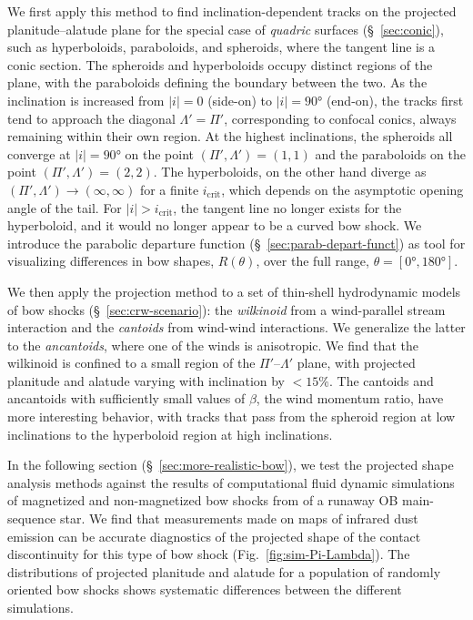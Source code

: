 \documentclass[useAMS, usenatbib, a4paper]{mnras}
\providecommand{\abs}[1]{\lvert#1\rvert}
\begin{document}
We first apply this method to find inclination-dependent tracks on the
projected planitude--alatude plane for the special case of
\textit{quadric} surfaces (\S~\ref{sec:conic}), such as hyperboloids,
paraboloids, and spheroids, where the tangent line is a conic section.
The spheroids and hyperboloids occupy distinct regions of the plane,
with the paraboloids defining the boundary between the two.  As the
inclination is increased from \(\abs{i} = 0\) (side-on) to
\(\abs{i} = \ang{90}\) (end-on), the tracks first tend to approach the
diagonal \(\Lambda' = \Pi'\), corresponding to confocal conics, always
remaining within their own region.  At the highest inclinations, the
spheroids all converge at \(\abs{i} = \ang{90}\) on the point
\((\Pi', \Lambda') = (1, 1)\) and the paraboloids on the point
\((\Pi', \Lambda') = (2, 2)\).  The hyperboloids, on the other hand diverge as
\((\Pi', \Lambda') \to (\infty, \infty)\) for a finite
\(i_{\mathrm{crit}}\), which depends on the asymptotic opening angle
of the tail.  For \(\abs{i} > i_{\mathrm{crit}}\), the tangent line no
longer exists for the hyperboloid, and it would no longer appear to be
a curved bow shock.  We introduce the parabolic departure function
(\S~\ref{sec:parab-depart-funct}) as tool for visualizing differences
in bow shapes, \(R(\theta)\), over the full range,
\(\theta = [\ang{0}, \ang{180}]\).

We then apply the projection method to a set of thin-shell
hydrodynamic models of bow shocks (\S~\ref{sec:crw-scenario}): the
\textit{wilkinoid} from a wind-parallel stream interaction and the
\textit{cantoids} from wind-wind interactions.  We generalize the
latter to the \textit{ancantoids}, where one of the winds is
anisotropic.  We find that the wilkinoid is confined to a small region
of the \(\Pi'\)--\(\Lambda'\) plane, with projected planitude and alatude
varying with inclination by \(< 15\%\).  The cantoids and ancantoids
with sufficiently small values of \(\beta\), the wind momentum ratio, have
more interesting behavior, with tracks that pass from the spheroid
region at low inclinations to the hyperboloid region at high
inclinations.

In the following section (\S~\ref{sec:more-realistic-bow}), we test the
projected shape analysis methods against the results of computational
fluid dynamic simulations of magnetized and non-magnetized bow shocks
from \citet{Meyer:2017a} of a runaway OB main-sequence star.  We find
that measurements made on maps of infrared dust emission can be
accurate diagnostics of the projected shape of the contact
discontinuity for this type of bow shock
(Fig.~\ref{fig:sim-Pi-Lambda}).  The distributions of projected
planitude and alatude for a population of randomly oriented bow shocks
shows systematic differences between the different simulations.
\end{document}
